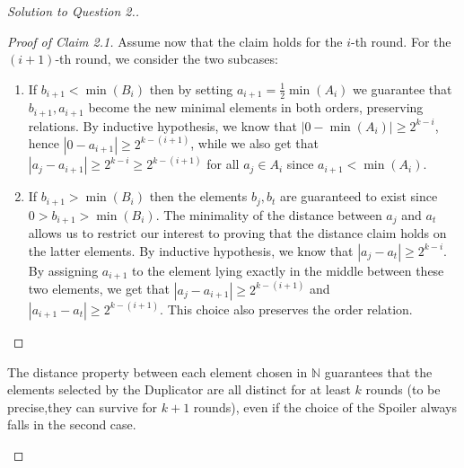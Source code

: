 \documentclass[12pt,a4paper]{report}
\theoremstyle{definition}
\newcommand{\abs}[1]{\left|#1\right|}
\newcommand{\N}{\mathbb{N}}                     %
\begin{document}
\begin{proof}[Solution to Question 2.]
\begin{enumerate}
\begin{proof}[Proof of Claim 2.1]
                Assume now that the claim holds for the $i$-th round. For the $(i+1)$-th round, we consider the two subcases:
                \begin{enumerate}
                    \item If $b_{i+1} < \min(B_i)$ then by setting $a_{i+1} = \frac{1}{2}\min(A_i)$ we guarantee that $b_{i+1}, a_{i+1}$ become the new minimal elements in both orders, preserving relations. By inductive hypothesis, we know that $\abs{0 - \min(A_i)} \geq 2^{k-i}$, hence $\abs{0 - a_{i+1}} \geq 2^{k-(i+1)}$, while we also get that $\abs{a_j - a_{i+1}} \geq 2^{k-i} \geq 2^{k-(i+1)}$ for all $a_j \in A_i$ since $a_{i+1} < \min(A_i)$.
                    \item If $b_{i+1} > \min(B_i)$ then the elements $b_j,b_t$ are guaranteed to exist since $0 > b_{i+1} > \min(B_i)$. The minimality of the distance between $a_j$ and $a_t$ allows us to restrict our interest to proving that the distance claim holds on the latter elements. By inductive hypothesis, we know that $\abs{a_j - a_t} \geq 2^{k-i}$. By assigning $a_{i+1}$ to the element lying exactly in the middle between these two elements, we get that $\abs{a_j - a_{i+1}} \geq 2^{k-(i+1)}$ and $\abs{a_{i+1} - a_t} \geq 2^{k-(i+1)}$. This choice also preserves the order relation.
                \end{enumerate}
            \end{proof}

            The distance property between each element chosen in $\N$ guarantees that the elements selected by the Duplicator are all distinct for at least $k$ rounds (to be precise,they can survive for $k+1$ rounds), even if the choice of the Spoiler always falls in the second case.
        \end{enumerate}

    \end{proof}
\end{document}
